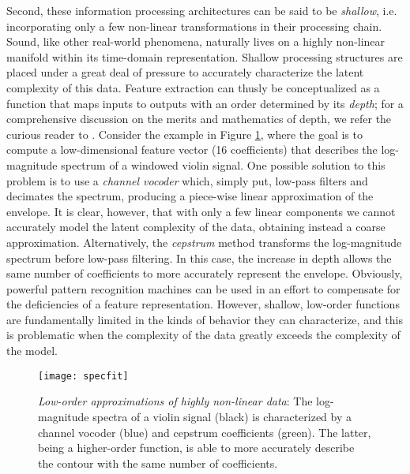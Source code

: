 Second, these information processing architectures can be said to be \emph{shallow}, i.e. incorporating only a few non-linear transformations in their processing chain.
Sound, like other real-world phenomena, naturally lives on a highly non-linear manifold within its time-domain representation.
Shallow processing structures are placed under a great deal of pressure to accurately characterize the latent complexity of this data.
Feature extraction can thusly be conceptualized as a function that maps inputs to outputs with an order determined by its \emph{depth}; for a comprehensive discussion on the merits and mathematics of depth, we refer the curious reader to \cite{Bengio2009}. 
Consider the example in Figure \ref{fig:curvefit}, where the goal is to compute a low-dimensional feature vector (16 coefficients) that describes the log-magnitude spectrum of a windowed violin signal.
One possible solution to this problem is to use a \emph{channel vocoder} which, simply put, low-pass filters and decimates the spectrum, producing a piece-wise linear approximation of the envelope.
It is clear, however, that with only a few linear components we cannot accurately model the latent complexity of the data, obtaining instead a coarse approximation.
Alternatively, the \emph{cepstrum} method transforms the log-magnitude spectrum before low-pass filtering.
In this case, the increase in depth allows the same number of coefficients to more accurately represent the envelope. 
Obviously, powerful pattern recognition machines can be used in an effort to compensate for the deficiencies of a feature representation.
However, shallow, low-order functions are fundamentally limited in the kinds of behavior they can characterize, and this is problematic when the complexity of the data greatly exceeds the complexity of the model.

\begin{figure}[t]
\begin{centering}
\texttt{[image: specfit]}
\caption{\emph{Low-order approximations of highly non-linear data}: The log-magnitude spectra of a violin signal (black) is characterized by a channel vocoder (blue) and cepstrum coefficients (green). The latter, being a higher-order function, is able to more accurately describe the contour with the same number of coefficients.}
\label{fig:curvefit}
\end{centering}
\end{figure}

